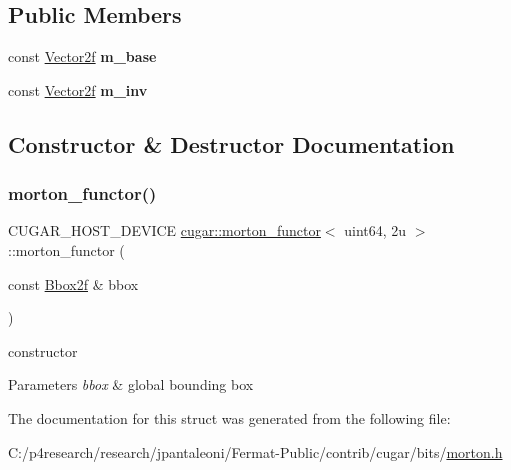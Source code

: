 \subsection*{Public Members}
\begin{DoxyCompactItemize}
\item 
\mbox{\label{structcugar_1_1morton__functor_3_01uint64_00_012u_01_4_ad0e1f43a04755987d6098d9ff4db0f2c}} 
const \hyperlink{structcugar_1_1_vector}{Vector2f} {\bfseries m\+\_\+base}
\item 
\mbox{\label{structcugar_1_1morton__functor_3_01uint64_00_012u_01_4_a328265a45a6604b809aff0cce6f67cc7}} 
const \hyperlink{structcugar_1_1_vector}{Vector2f} {\bfseries m\+\_\+inv}
\end{DoxyCompactItemize}


\subsection{Constructor \& Destructor Documentation}
\mbox{\label{structcugar_1_1morton__functor_3_01uint64_00_012u_01_4_a3f8e8326fdde7dee3704ea353df1b1f5}} 
\subsubsection{\texorpdfstring{morton\+\_\+functor()}{morton\_functor()}}
{\footnotesize\ttfamily C\+U\+G\+A\+R\+\_\+\+H\+O\+S\+T\+\_\+\+D\+E\+V\+I\+CE \hyperlink{structcugar_1_1morton__functor}{cugar\+::morton\+\_\+functor}$<$ uint64, 2u $>$\+::morton\+\_\+functor (\begin{DoxyParamCaption}\item[{const \hyperlink{structcugar_1_1_bbox}{Bbox2f} \&}]{bbox }\end{DoxyParamCaption})\hspace{0.3cm}{\ttfamily [inline]}}

constructor


\begin{DoxyParams}{Parameters}
{\em bbox} & global bounding box \\
\hline
\end{DoxyParams}


The documentation for this struct was generated from the following file\+:\begin{DoxyCompactItemize}
\item 
C\+:/p4research/research/jpantaleoni/\+Fermat-\/\+Public/contrib/cugar/bits/\hyperlink{morton_8h}{morton.\+h}\end{DoxyCompactItemize}
